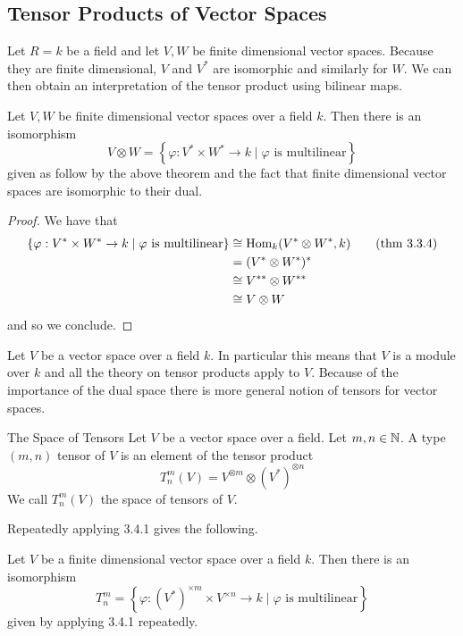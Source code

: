 \documentclass[a4paper]{article}
\begin{document}
\subsection{Tensor Products of Vector Spaces}
Let $R=k$ be a field and let $V,W$ be finite dimensional vector spaces. Because they are finite dimensional, $V$ and $V^\ast$ are isomorphic and similarly for $W$. We can then obtain an interpretation of the tensor product using bilinear maps. 

\begin{crl}{}{} Let $V,W$ be finite dimensional vector spaces over a field $k$. Then there is an isomorphism $$V\otimes W=\left\{\varphi:V^\ast\times W^\ast\to k\;|\;\varphi\text{ is multilinear}\right\}$$ given as follow by the above theorem and the fact that finite dimensional vector spaces are isomorphic to their dual. \tcbline
\begin{proof}
We have that 
\begin{align*}
\left\{\varphi:V^\ast\times W^\ast\to k\;|\;\varphi\text{ is multilinear}\right\}&\cong\operatorname{Hom}_k(V^\ast\otimes W^\ast,k)\tag{thm 3.3.4}\\
&=(V^\ast\otimes W^\ast)^\ast\\
&\cong V^{\ast\ast}\otimes W^{\ast\ast}\\
&\cong V\otimes W
\end{align*}
and so we conclude. 
\end{proof}
\end{crl}

Let $V$ be a vector space over a field $k$. In particular this means that $V$ is a module over $k$ and all the theory on tensor products apply to $V$. Because of the importance of the dual space there is more general notion of tensors for vector spaces. 

\begin{defn}{The Space of Tensors}{} Let $V$ be a vector space over a field. Let $m,n\in\mathbb{N}$. A type $(m,n)$ tensor of $V$ is an element of the tensor product $$T_n^m(V)=V^{\otimes m}\otimes(V^\ast)^{\otimes n}$$ We call $T_n^m(V)$ the space of tensors of $V$. 
\end{defn}

Repeatedly applying 3.4.1 gives the following. 

\begin{thm}{}{} Let $V$ be a finite dimensional vector space over a field $k$. Then there is an isomorphism $$T_n^m=\left\{\varphi:(V^\ast)^{\times m}\times V^{\times n}\to k\;|\;\varphi\text{ is multilinear}\right\}$$ given by applying 3.4.1 repeatedly. 
\end{thm}
\end{document}
